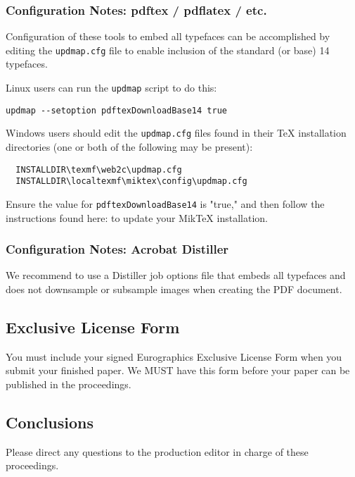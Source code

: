 \subsubsection*{Configuration Notes: pdftex / pdflatex / etc.}

\noindent
Configuration of these tools to embed all typefaces can be accomplished by editing the \texttt{updmap.cfg} file
to enable inclusion of the standard (or base) 14 typefaces.

Linux users can run the \texttt{updmap} script to do this:
\begin{verbatim}
updmap --setoption pdftexDownloadBase14 true
\end{verbatim}

Windows users should edit the \texttt{updmap.cfg} files found in their TeX installation directories (one or both
of the following may be present):
\begin{verbatim}
  INSTALLDIR\texmf\web2c\updmap.cfg
  INSTALLDIR\localtexmf\miktex\config\updmap.cfg
\end{verbatim}

Ensure the value for \texttt{pdftexDownloadBase14} is "true," and then follow the instructions found here:
 to update your MikTeX installation.

\subsubsection*{Configuration Notes: Acrobat Distiller}

We recommend to use a Distiller job options file that embeds
all typefaces and does not downsample or subsample images when creating the PDF document.
\subsection{Exclusive License Form}

You must include your signed Eurographics Exclusive License Form 
when you submit your finished paper. We MUST have this form before
your paper can be published in the proceedings.

\subsection{Conclusions}

Please direct any questions to the production editor in charge of
these proceedings.

 
       



